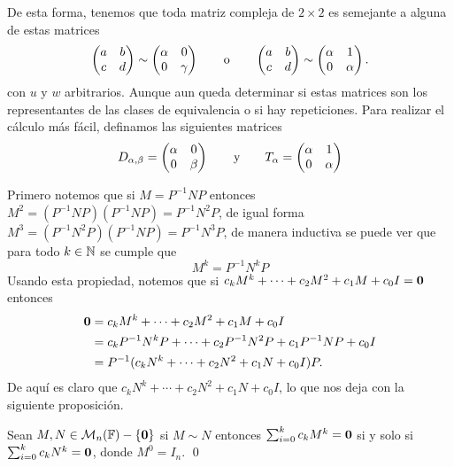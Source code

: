 De esta forma, tenemos que toda matriz compleja de $2 \times 2$ es semejante a alguna de estas matrices
\begin{equation}
  \begin{pmatrix} a & b \\ c & d \end{pmatrix} \sim \begin{pmatrix} \alpha & 0 \\ 0 & \gamma \end{pmatrix}
    \qquad\text{o}\qquad
    \begin{pmatrix} a & b \\ c & d \end{pmatrix} \sim \begin{pmatrix} \alpha & 1 \\ 0 & \alpha \end{pmatrix}.
      \label{eq:M2Form}
\end{equation}
con $u$ y $w$ arbitrarios. Aunque aun queda determinar si estas matrices son los representantes de las clases de equivalencia o si hay repeticiones. Para realizar el cálculo más fácil, definamos las siguientes matrices 
\[
  D_{\alpha,\beta} = \begin{pmatrix} \alpha & 0 \\ 0 & \beta \end{pmatrix}
     \qquad\text{y}\qquad
  T_\alpha = \begin{pmatrix} \alpha & 1 \\ 0 & \alpha \end{pmatrix}
\]

Primero notemos que si $M = P^{-1} N P$ entonces $M^2 = (P^{-1} N P)(P^{-1} N P) = P^{-1}N^2 P$, de igual forma $M^3 = (P^{-1}N^2 P) (P^{-1} N P) = P^{-1}N^3 P$, de manera inductiva se puede ver que para todo $k \in \mathbb{N}$ se cumple que
\[
  M^k = P^{-1} N^k P
\]
Usando esta propiedad, notemos que si $c_k M^k + \cdots + c_2 M^2 + c_1 M + c_0 I = \mathbf{0}$ entonces
\begin{align*}
  \mathbf{0} &= c_k M^k + \cdots + c_2 M^2 + c_1 M + c_0 I \\
    &= c_k P^{-1}N^k P + \cdots + c_2 P^{-1}N^2 P + c_1 P^{-1}N P + c_0 I \\
    &= P^{-1} (c_k N^k + \cdots + c_2 N^2 + c_1 N + c_0 I) P.
\end{align*}
De aquí es claro que $c_k N^k + \cdots + c_2 N^2 + c_1 N + c_0 I$, lo que nos deja con la siguiente proposición.

\begin{prop} \label{prop:MPolySem}
  Sean $M, N \in \mathcal{M}_n(\mathbb{F}) - \{\mathbf{0}\}$ si $M \sim N$ entonces $\sum_{i=0}^k c_k M^k = \mathbf{0}$ si y solo si $\sum_{i=0}^k c_k N^k = \mathbf{0}$, donde $M^0 = I_n$. \qed
\end{prop}

